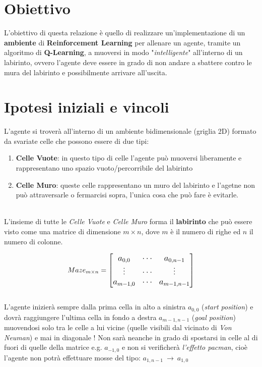 \section{Obiettivo}

L'obiettivo di questa relazione \`{e} quello di realizzare un'implementazione di un \textbf{ambiente} di \textbf{Reinforcement Learning} per allenare un agente, tramite un algoritmo di \textbf{Q-Learning}, a muoversi in modo "\textit{intelligente}" all'interno di un labirinto, ovvero l'agente deve essere in grado di non andare a sbattere contro le mura del labirinto e possibilmente arrivare all'uscita.

\section{Ipotesi iniziali e vincoli}
L'agente si trover\`{a} all'interno di un ambiente bidimensionale (griglia 2D) formato da svariate celle che possono essere di due tipi:

\begin{enumerate}
	\item \textbf{Celle Vuote}: in questo tipo di celle l'agente pu\`{o} muoversi liberamente e rappresentano uno spazio vuoto/percorribile del labirinto
	\item \textbf{Celle Muro}: queste celle rappresentano un muro del labirinto e l'agetne non pu\`{o} attraversarle o fermarcisi sopra, l'unica cosa che pu\`{o} fare \`{e} evitarle.
\end{enumerate}
\ \\
L'insieme di tutte le \textit{Celle Vuote} e \textit{Celle Muro} forma il \textbf{labirinto} che pu\`{o} essere visto come una matrice di dimensione $m \times n$, dove $m$ \`{e} il numero di righe ed $n$ il numero di colonne.

\begin{equation*}
\large
Maze_{m \times n}=
\begin{bmatrix}
a_{0,0} & \cdots & a_{0,n-1} \\
\vdots & \cdots & \vdots \\
a_{m-1,0} & \cdots & a_{m-1,n-1}
\end{bmatrix}
\end{equation*}
\ \\
L'agente inizier\`{a} sempre dalla prima cella in alto a sinistra $a_{0,0}$ (\textit{start position}) e dovr\`{a} raggiungere l'ultima cella in fondo a destra $a_{m-1,n-1}$ (\textit{goal position})  muovendosi solo tra le celle a lui vicine (quelle visibili dal vicinato di \textit{Von Neuman}) e mai in diagonale ! Non sar\`{a} neanche in grado di spostarsi in celle al di fuori di quelle della matrice e.g. $a_{-1, 0}$ e non si verificher\`{a} \textit{l'effetto pacman}, cio\`{e} l'agente non potr\`{a} effettuare mosse del tipo: $ a_{1,n-1} \ \rightarrow \ a_{1, 0}$

